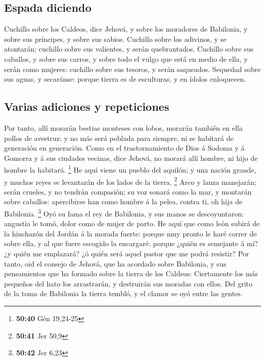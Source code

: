 \hypertarget{espada-diciendo}{%
\subsection{Espada diciendo}\label{espada-diciendo}}

 Cuchillo sobre los Caldeos, dice Jehová, y sobre los
moradores de Babilonia, y sobre sus príncipes, y sobre sus sabios.
 Cuchillo sobre los adivinos, y se atontarán; cuchillo
sobre sus valientes, y serán quebrantados.  Cuchillo
sobre sus caballos, y sobre sus carros, y sobre todo el vulgo que está
en medio de ella, y serán como mujeres: cuchillo sobre sus tesoros, y
serán saqueados.  Sequedad sobre sus aguas, y secaránse:
porque tierra es de esculturas, y en ídolos enloquecen.

\hypertarget{varias-adiciones-y-repeticiones}{%
\subsection{Varias adiciones y
repeticiones}\label{varias-adiciones-y-repeticiones}}

 Por tanto, allí morarán bestias monteses con lobos,
morarán también en ella pollos de avestruz: y no más será poblada para
siempre, ni se habitará de generación en generación. 
Como en el trastornamiento de Dios á Sodoma y á Gomorra y á sus ciudades
vecinas, dice Jehová, no morará allí hombre, ni hijo de hombre la
habitará. \footnote{\textbf{50:40} Gén 19,24-25}  He aquí
viene un pueblo del aquilón; y una nación grande, y muchos reyes se
levantarán de los lados de la tierra. \footnote{\textbf{50:41} Jer 50,9}
 Arco y lanza manejarán; serán crueles, y no tendrán
compasión; su voz sonará como la mar, y montarán sobre caballos:
apercibirse han como hombre á la pelea, contra ti, oh hija de Babilonia.
\footnote{\textbf{50:42} Jer 6,23}  Oyó su fama el rey de
Babilonia, y sus manos se descoyuntaron: angustia le tomó, dolor como de
mujer de parto.  He aquí que como león subirá de la
hinchazón del Jordán á la morada fuerte: porque muy pronto le haré
correr de sobre ella, y al que fuere escogido la encargaré: porque
¿quién es semejante á mí? ¿y quién me emplazará? ¿ó quién será aquel
pastor que me podrá resistir?  Por tanto, oid el consejo
de Jehová, que ha acordado sobre Babilonia, y sus pensamientos que ha
formado sobre la tierra de los Caldeos: Ciertamente los más pequeños del
hato los arrastrarán, y destruirán sus moradas con ellos.
 Del grito de la toma de Babilonia la tierra tembló, y el
clamor se oyó entre las gentes.

